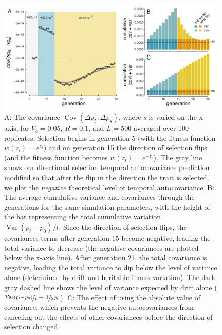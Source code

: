 \documentclass[11pt]{article}
\DeclareMathOperator{\var}{Var}
\DeclareMathOperator{\cov}{Cov}
\begin{document}
\begin{figure}
  \centering
  \includegraphics{./images/fluct-sel.pdf} 
  \caption{A: The covariance $\cov(\Delta p_5, \Delta p_s)$, where $s$
    is varied on the x-axis, for $V_a=0.05$, $R=0.1$, and $L=500$ averaged over
    100 replicates. Selection begins in generation 5 (with the fitness function
    $w(z_i)=e^{z_i}$) and on generation 15 the direction of selection flips (and
    the fitness function becomes $w(z_i) = e^{-z_i}$). The gray line shows our
    directional selection temporal autocovariance prediction modified so that
    after the flip in the direction the trait is selected, we plot the
    \emph{negative} theoretical level of temporal autocovariance. B:
    The average cumulative variance and covariances through the
    generations for the same simulation parameters, with the height of the bar
    representing the total cumulative variation $\var(p_t - p_0)/t$. Since the
    direction of selection flips, the covariances terms after generation 15
    become negative, leading the total variance to decrease (the negative
    covariances are plotted below the x-axis line). After generation 21, the
    total covariance is negative, leading the total variance to dip below the
    level of variance alone (determined by drift and heritable fitness
    variation). The dark gray dashed line shows the level of variance expected by
    drift alone ($\nicefrac{\var(p_t-p_0)}{t} = \nicefrac{1}{2N}$). C:
    The effect of using the absolute value of covariance, which prevents
    the negative autocovariances from canceling out the effects of other
    covariances before the direction of selection changed.} 
\label{fig:fluct-sel}
\end{figure}
\end{document}
